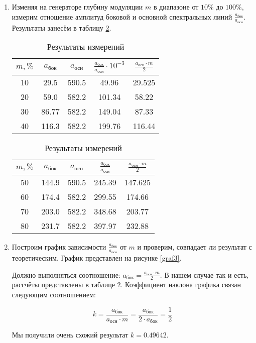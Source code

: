 \documentclass[a4paper,12pt]{article} %
\begin{document}
\begin{enumerate}
    \item Изменяя на генераторе глубину модуляции $m$ в диапазоне от $10 \%$ до $100 \%$, измерим отношение амплитуд боковой и основной спектральных линий $\frac{a_{\text{бок}}}{a_{\text{осн}}}$. Результаты занесём в таблицу \ref{tab5}.

    \begin{table}[h]
	\centering
		\begin{tabular}{|c|c|c|c|c|}
			\hline
                $m, \%$ & $a_{\text{бок}}$ & $a_{\text{осн}}$ &$\frac{a_{\text{бок}}} {a_{\text{осн}}} \cdot 10^{-3}$ & $\frac{a_{\text{осн}} \cdot m}{2}$ \\ \hline
                10 & 29.5 & 590.5 & 49.96 & 29.525 \\ \hline
                20 & 59.0 & 582.2 & 101.34 & 58.22 \\ \hline
                30 & 86.77 & 582.2 & 149.04 & 87.33 \\ \hline
                40 & 116.3 & 582.2 & 199.76 & 116.44 \\ \hline
		\end{tabular}
            \hspace{.02\textwidth}
            \begin{tabular}{|c|c|c|c|c|}
			\hline
                $m, \%$ & $a_{\text{бок}}$ & $a_{\text{осн}}$ &$\frac{a_{\text{бок}}}{a_{\text{осн}}}$ & $\frac{a_{\text{осн}} \cdot m}{2}$ \\ \hline
                50 & 144.9 & 590.5 & 245.39 & 147.625 \\ \hline
                60 & 174.4 & 582.2 & 299.55 & 174.66 \\ \hline
                70 & 203.0 & 582.2 & 348.68 & 203.77 \\ \hline
                80 & 231.7 & 582.2 & 397.97 & 232.88 \\ \hline
		\end{tabular}
	\caption{Результаты измерений}
        \label{tab5}
    \end{table}

    \item Построим график зависимости $\frac{a_{\text{бок}}}{a_{\text{осн}}}$ от $m$ и проверим, совпадает ли результат с теоретическим. График представлен на рисунке \ref{graf3}.

    Должно выполняться соотношение: $a_{\text{бок}} = \frac{a_{\text{осн}} \cdot m}{2}$. В нашем случае так и есть, рассчёты представлены в таблице \ref{tab5}. Коэффициент наклона графика связан следующим соотношением:

    \[ k = \frac{a_{\text{бок}}}{a_{\text{осн}} \cdot m} =  \frac{a_{\text{бок}}}{2 \cdot a_{\text{бок}}} = \frac{1}{2}\]

    Мы получили очень схожий результат $k = 0.49642$.
\end{enumerate}
\end{document}

